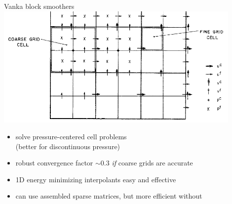 \begin{frame}{Vanka block smoothers}
  \includegraphics[width=0.9\textwidth]{figures/VankaStaggeredGrid} \\
  \begin{itemize}
  \item solve pressure-centered cell problems \\
    \quad (better for discontinuous pressure)
  \item robust convergence factor $\sim 0.3$ \emph{if} coarse grids are accurate
  \item 1D energy minimizing interpolants easy and effective
  \item can use assembled sparse matrices, but more efficient without
  \end{itemize}
\end{frame}
